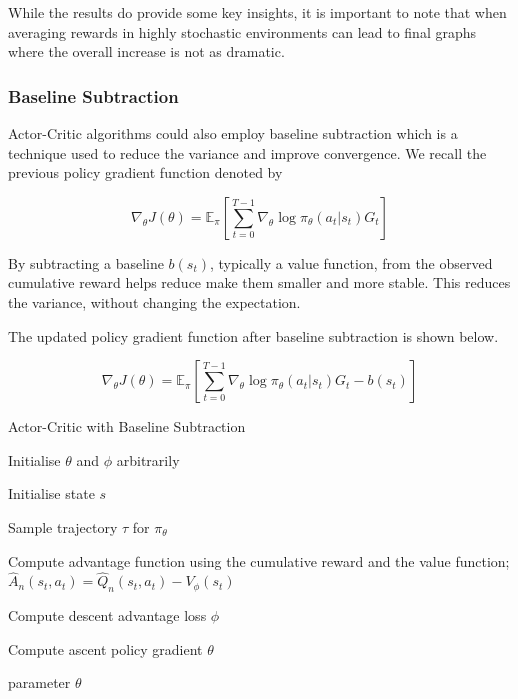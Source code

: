 \documentclass{article}
\begin{document}
While the results do provide some key insights, it is important to note that when averaging rewards in highly stochastic environments can lead to final graphs where the overall increase is not as dramatic.


\subsubsection{Baseline Subtraction}
Actor-Critic algorithms could also employ baseline subtraction which is a technique used to reduce the variance and improve convergence. We recall the previous policy gradient function denoted by 

\begin{equation*}
\nabla_\theta J(\theta) = \mathbb{E}_\pi[\sum _{t=0}^{T-1}  \nabla_\theta \log\pi_\theta (a_t|s_t)G_t]
\end{equation*}

By subtracting a baseline $b(s_t)$, typically a value function,  from the observed cumulative reward helps reduce make them smaller and more stable. This reduces the variance, without changing the expectation. \cite{david-ucl-lecture}

The updated policy gradient function after baseline subtraction is shown below. 

\begin{equation*}
\nabla_\theta J(\theta) = \mathbb{E}_\pi[\sum _{t=0}^{T-1}  \nabla_\theta\log\pi_\theta (a_t|s_t)G_t - b(s_t)]
\end{equation*}
\begin{algorithm}[htbp]
\caption{Actor-Critic with Baseline Subtraction}
\SetAlgoLined
\DontPrintSemicolon
\small %
Initialise $\theta$ and $\phi$ arbitrarily\;\\
{
    Initialise state $s$\;
     \item Sample trajectory $\tau$ for $\pi_\theta$
     \item
    {
     \item Compute advantage function using the cumulative reward and the value function;
     \(\hat{A}_n(s_t,a_t) = \hat{Q}_n(s_t,a_t) - V_\phi(s_t)\)
    }
    \item Compute descent advantage loss $\phi$
    \item Compute ascent policy gradient $\theta$
}
\State \Return parameter $\theta$
\end{algorithm}
\end{document}
